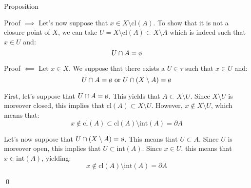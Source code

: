 \documentclass[a4paper]{article}
\begin{document}
\begin{parag}{Proposition}
\begin{subparag}{Proof $\implies$}
        Let's now suppose that $x \in X \setminus \text{cl}\left(A\right)$. To show that it is not a closure point of $X$, we can take $U = X \setminus \text{cl}\left(A\right) \subset X \setminus A$ which is indeed such that $x \in U$ and: 
        \[U \cap A = \o\]
    \end{subparag}

    \begin{subparag}{Proof $\impliedby$}
        Let $x \in X$. We suppose that there exists a $U \in \tau$ such that $x \in U$ and: 
        \[U \cap A = \o \text{ or } U \cap \left(X \setminus A\right) = \o\]
        
        First, let's suppose that $U \cap A = \o$. This yields that $A \subset X \setminus U$. Since $X \setminus U$ is moreover closed, this implies that $\text{cl}\left(A\right) \subset X \setminus U$. However, $x \not \in X \setminus U$, which means that:
        \[x \not \in \text{cl}\left(A\right) \subset \text{cl}\left(A\right) \setminus \text{int}\left(A\right) = \partial A\]

        Let's now suppose that $U \cap \left(X \setminus A\right) = \o$. This means that $U \subset A$. Since $U$ is moreover open, this implies that $U \subset \text{int}\left(A\right)$. Since $x \in U$, this means that $x \in \text{int}\left(A\right)$, yielding:
        \[x \not \in \text{cl}\left(A\right) \setminus \text{int}\left(A\right) = \partial A\]

        \qed
    \end{subparag}
\end{parag}
\end{document}
